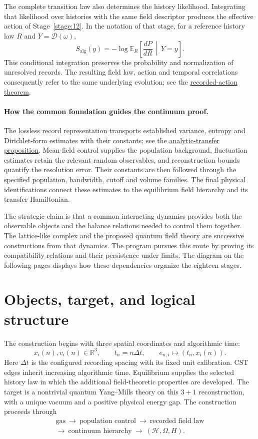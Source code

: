 \documentclass[11pt,a4paper]{article}
\begin{document}
The complete transition law also determines the history likelihood.
Integrating that likelihood over histories with the same field descriptor
produces the effective action of Stage~\ref{stage:12}. In the notation of
that stage, for a reference history law \(R\) and \(Y=\mathscr D(\omega)\),
\[
S_{\mathrm{alg}}(y)
=-\log\mathbb E_R\!\left[\frac{dP}{dR}\,\middle|\,Y=y\right].
\]
This conditional integration preserves the probability and normalization
of unresolved records. The resulting field law, action and temporal
correlations consequently refer to the same underlying evolution; see the
\hyperref[src:thm-ym-recorded-action-emergence]{recorded-action theorem}.

\paragraph{How the common foundation guides the continuum proof.}
The lossless record representation transports established variance,
entropy and Dirichlet-form estimates with their constants; see the
\hyperref[src:prop-fractal-set-analytic-transfer]{analytic-transfer proposition}.
Mean-field control supplies the population background, fluctuation estimates
retain the relevant random observables, and reconstruction bounds quantify
the resolution error. Their constants are then followed through the
specified population, bandwidth, cutoff and volume families. The final
physical identifications connect these estimates to the equilibrium field
hierarchy and its transfer Hamiltonian.

The strategic claim is that a common interacting dynamics provides both
the observable objects and the balance relations needed to control them
together. The lattice-like complex and the proposed quantum field theory
are successive constructions from that dynamics. The program pursues this
route by proving its compatibility relations and their persistence under
limits. The diagram on the following pages displays how these dependencies
organize the eighteen stages.
\clearpage
\section*{Objects, target, and logical structure}
The construction begins with three spatial coordinates and algorithmic time:
\[
x_i(n),v_i(n)\in\mathbb R^3,\qquad t_n=n\Delta t,\qquad
e_{n,i}\mapsto(t_n,x_i(n)).
\]
Here \(\Delta t\) is the configured recording spacing with its fixed unit calibration. CST edges inherit increasing algorithmic time. Equilibrium supplies the selected history law in which the additional field-theoretic properties are developed. The target is a nontrivial quantum Yang--Mills theory on this \(3+1\) reconstruction, with a unique vacuum and a positive physical energy gap. The construction proceeds through
\[
\begin{gathered}\text{gas}\ \longrightarrow\ \text{population control}\ \longrightarrow\ \text{recorded field law}\\
\longrightarrow\ \text{continuum hierarchy}\ \longrightarrow\ (\mathcal H,\Omega,H).\end{gathered}
\]
\end{document}
